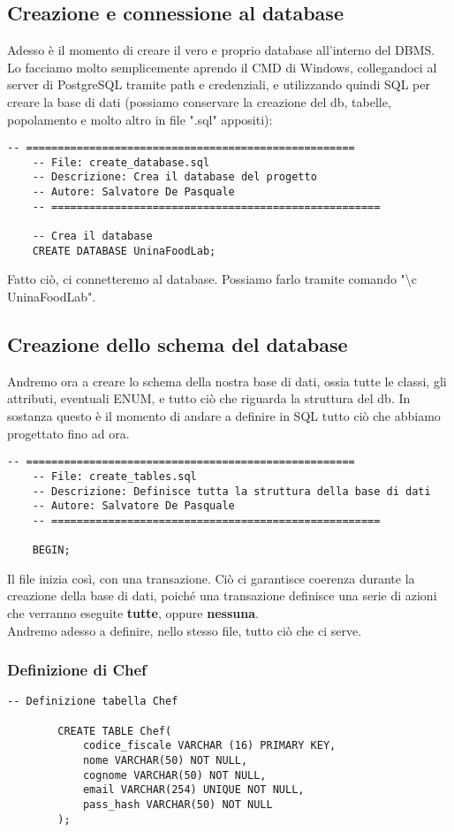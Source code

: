 \documentclass[a4paper, 12pt]{article}
\begin{document}
    \subsection{Creazione e connessione al database}
    Adesso è il momento di creare il vero e proprio database all'interno del DBMS. Lo facciamo molto semplicemente aprendo il CMD di Windows, collegandoci al server di PostgreSQL tramite path e credenziali, e utilizzando quindi SQL per creare la base di dati (possiamo conservare la creazione del db, tabelle, popolamento e molto altro in file ".sql" appositi):
    \begin{lstlisting}[style=sqlstyle]
    -- ====================================================
    -- File: create_database.sql
    -- Descrizione: Crea il database del progetto
    -- Autore: Salvatore De Pasquale
    -- ====================================================
    
    -- Crea il database
    CREATE DATABASE UninaFoodLab;
    \end{lstlisting}
    Fatto ciò, ci connetteremo al database. Possiamo farlo tramite comando "\textbackslash c UninaFoodLab".

    \newpage
    \subsection{Creazione dello schema del database}
    Andremo ora a creare lo schema della nostra base di dati, ossia tutte le classi, gli attributi, eventuali ENUM, e tutto ciò che riguarda la struttura del db. In sostanza questo è il momento di andare a definire in SQL tutto ciò che abbiamo progettato fino ad ora.
    \begin{lstlisting}[style=sqlstyle]
    -- ====================================================
    -- File: create_tables.sql
    -- Descrizione: Definisce tutta la struttura della base di dati
    -- Autore: Salvatore De Pasquale
    -- ====================================================
    
    BEGIN;
    \end{lstlisting}
    Il file inizia così, con una transazione. Ciò ci garantisce coerenza durante la creazione della base di dati, poiché una transazione definisce una serie di azioni che verranno eseguite \textbf{tutte}, oppure \textbf{nessuna}.\\[0.2cm]
    Andremo adesso a definire, nello stesso file, tutto ciò che ci serve.
        \subsubsection{Definizione di Chef}
        \begin{lstlisting}[style=sqlstyle]
        -- Definizione tabella Chef
        
        CREATE TABLE Chef(
            codice_fiscale VARCHAR (16) PRIMARY KEY,
            nome VARCHAR(50) NOT NULL,
            cognome VARCHAR(50) NOT NULL,
            email VARCHAR(254) UNIQUE NOT NULL,
            pass_hash VARCHAR(50) NOT NULL
        );
        \end{lstlisting}
\end{document}

